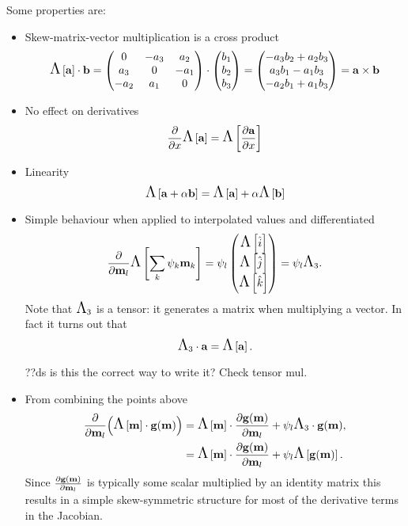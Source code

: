 Some properties are:
\begin{itemize}
\item Skew-matrix-vector multiplication is a cross product
  \begin{equation}
    \skewm{\av} \cdot \bv
    = \begin{pmatrix}
      0 & -a_3 & a_2 \\
      a_3 & 0 & -a_1 \\
      -a_2 & a_1 & 0
    \end{pmatrix}
    \cdot \threevec{b_1}{b_2}{b_3}
    = \threevec{-a_3b_2 + a_2b_3}{a_3b_1 - a_1b_3}{-a_2b_1 + a_1b_3}
    = \av \times \bv
  \end{equation}

\item No effect on derivatives
  \begin{equation}
    \pd{}{x} \skewm{\av} = \skewm{ \pd{\av}{x} }
  \end{equation}

\item Linearity
  \begin{equation}
    \skewm{\av + \alpha \bv} = \skewm{\av} + \alpha \skewm{\bv}
  \end{equation}

\item Simple behaviour when applied to interpolated values and differentiated
  \begin{equation}
    \pd{}{\mv_l} \skewm{\intp{\mv}} = \sbf_l \threevec{\skewm{\iv}}{\skewm{\jv}}{\skewm{\kv}}
    = \sbf_l \skewop_3.
  \end{equation}
  Note that $\skewop_3$ is a tensor: it generates a matrix when multiplying a vector. In fact it turns out that
  \begin{equation}
    \skewop_3 \cdot \av = \skewm{\av}.
  \end{equation}

  ??ds is this the correct way to write it? Check tensor mul.

\item From combining the points above
  \begin{equation}
    \begin{aligned}
      \pd{}{\mv_l} \bigb{\skewm{\mv}\cdot \gv(\mv)} &= \skewm{\mv}\cdot \pd{\gv(\mv)}{\mv_l}
           + \sbf_l \skewop_3 \cdot \gv(\mv), \\
           &= \skewm{\mv}\cdot \pd{\gv(\mv)}{\mv_l} + \sbf_l \skewm{\gv(\mv)}.
    \end{aligned}
  \end{equation} 
  Since $\pd{\gv(\mv)}{\mv_l}$ is typically some scalar multiplied by an identity matrix this results in a simple skew-symmetric structure for most of the derivative terms in the Jacobian.

\end{itemize}

